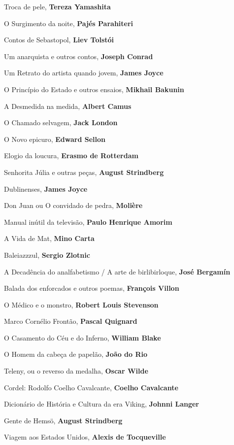 \begin{multicols}{2}
\begin{enumerate}
{\item Troca de pele, \textbf{Tereza Yamashita}
\item O Surgimento da noite, \textbf{Pajés Parahiteri}
\item Contos de Sebastopol, \textbf{Liev Tolstói}
\item Um anarquista e outros contos, \textbf{Joseph Conrad}
\item Um Retrato do artista quando jovem, \textbf{James Joyce}
\item O Princípio do Estado e outros ensaios, \textbf{Mikhail Bakunin}
\item A Desmedida na medida, \textbf{Albert Camus}
\item O Chamado selvagem, \textbf{Jack London}
\item O Novo epicuro, \textbf{Edward Sellon}
\item Elogio da loucura, \textbf{Erasmo de Rotterdam}
\item Senhorita Júlia e outras peças, \textbf{August Strindberg}
\item Dublinenses, \textbf{James Joyce}
\item Don Juan ou O convidado de pedra, \textbf{Molière}
\item Manual inútil da televisão, \textbf{Paulo Henrique Amorim}
\item A Vida de Mat, \textbf{Mino Carta}
\item Baleiazzzul, \textbf{Sergio Zlotnic}
\item A Decadência do analfabetismo / A arte de birlibirloque, \textbf{José Bergamín}
\item Balada dos enforcados e outros poemas, \textbf{François Villon}
\item O Médico e o monstro, \textbf{Robert Louis Stevenson}
\item Marco Cornélio Frontão, \textbf{Pascal Quignard}
\item O Casamento do Céu e do Inferno, \textbf{William Blake}
\item O Homem da cabeça de papelão, \textbf{João do Rio}
\item Teleny, ou o reverso da medalha, \textbf{Oscar Wilde}
\item Cordel: Rodolfo Coelho Cavalcante, \textbf{Coelho Cavalcante}
\item Dicionário de História e Cultura da era Viking, \textbf{Johnni Langer}
\item Gente de Hemsö, \textbf{August Strindberg}
\item Viagem aos Estados Unidos, \textbf{Alexis de Tocqueville}
}
\end{enumerate}
\end{multicols}
